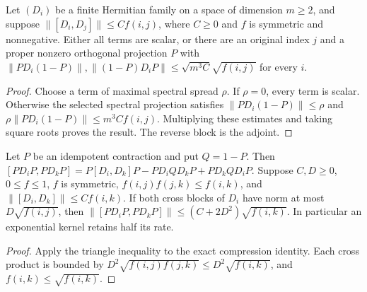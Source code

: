 \begin{lemma}
    \label{thm:hastings05_uniform_family_split}
    \leanok
    Let $(D_i)$ be a finite Hermitian family on a space of dimension
    $m\ge2$, and suppose $\|[D_i,D_j]\|\le C f(i,j)$, where $C\ge0$
    and $f$ is symmetric and nonnegative. Either all terms are scalar,
    or there are an original index $j$ and a proper nonzero orthogonal
    projection $P$ with
    $\|PD_i(1-P)\|,\|(1-P)D_iP\|\le\sqrt{m^3C}\sqrt{f(i,j)}$ for every $i$.
\end{lemma}
\begin{proof}\leanok
    Choose a term of maximal spectral spread $\rho$. If $\rho=0$, every
    term is scalar. Otherwise the selected spectral projection satisfies
    $\|PD_i(1-P)\|\le\rho$ and
    $\rho\|PD_i(1-P)\|\le m^3Cf(i,j)$. Multiplying these estimates and
    taking square roots proves the result. The reverse block is the adjoint.
\end{proof}

\begin{lemma}
    \label{thm:hastings05_split_compression_decay}
    \leanok
    Let $P$ be an idempotent contraction and put $Q=1-P$.
    Then $[PD_iP,PD_kP]=P[D_i,D_k]P-PD_iQD_kP+PD_kQD_iP$.
    Suppose $C,D\ge0$, $0\le f\le1$, $f$ is symmetric,
    $f(i,j)f(j,k)\le f(i,k)$, and $\|[D_i,D_k]\|\le Cf(i,k)$.
    If both cross blocks of $D_i$ have norm at most $D\sqrt{f(i,j)}$,
    then $\|[PD_iP,PD_kP]\|\le(C+2D^2)\sqrt{f(i,k)}$.
    In particular an exponential kernel retains half its rate.
\end{lemma}
\begin{proof}\leanok
    Apply the triangle inequality to the exact compression identity.
    Each cross product is bounded by
    $D^2\sqrt{f(i,j)f(j,k)}\le D^2\sqrt{f(i,k)}$, and
    $f(i,k)\le\sqrt{f(i,k)}$.
\end{proof}


